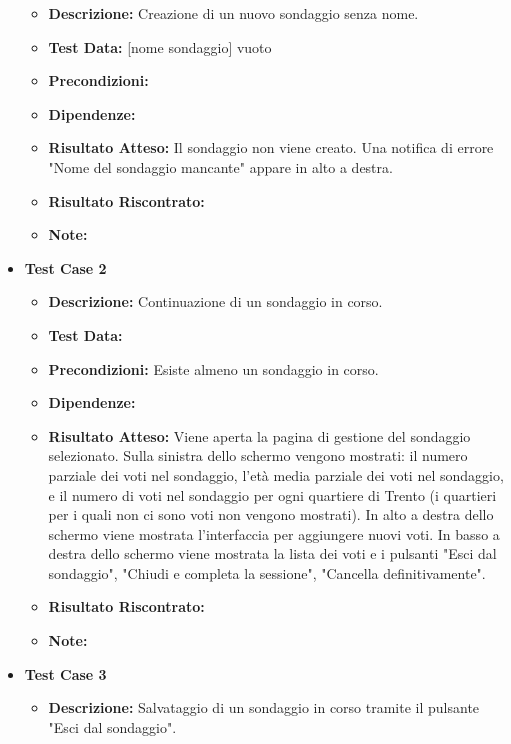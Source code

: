 \begin{itemize}
                \begin{itemize}
                    \item \textbf{Descrizione:} Creazione di un nuovo sondaggio senza nome.
                    \item \textbf{Test Data:} [nome sondaggio] vuoto
                    \item \textbf{Precondizioni:} 
                    \item \textbf{Dipendenze:}
                    \item \textbf{Risultato Atteso:} Il sondaggio non viene creato. Una notifica di errore "Nome del sondaggio mancante" appare in alto a destra.
                    \item \textbf{Risultato Riscontrato:}
                    \item \textbf{Note:}
                \end{itemize}
            \item \textbf{Test Case 2}
                \begin{itemize}
                    \item \textbf{Descrizione:} Continuazione di un sondaggio in corso.
                    \item \textbf{Test Data:}
                    \item \textbf{Precondizioni:} Esiste almeno un sondaggio in corso.
                    \item \textbf{Dipendenze:}
                    \item \textbf{Risultato Atteso:} Viene aperta la pagina di gestione del sondaggio selezionato. Sulla sinistra dello schermo vengono mostrati: il numero parziale dei voti nel sondaggio, l'età media parziale dei voti nel sondaggio, e il numero di voti nel sondaggio per ogni quartiere di Trento (i quartieri per i quali non ci sono voti non vengono mostrati). In alto a destra dello schermo viene mostrata l'interfaccia per aggiungere nuovi voti. In basso a destra dello schermo viene mostrata la lista dei voti e i pulsanti "Esci dal sondaggio", "Chiudi e completa la sessione", "Cancella definitivamente".
                    \item \textbf{Risultato Riscontrato:}
                    \item \textbf{Note:}
                \end{itemize}
            \item \textbf{Test Case 3}
                \begin{itemize}
                    \item \textbf{Descrizione:} Salvataggio di un sondaggio in corso tramite il pulsante "Esci dal sondaggio".

\end{itemize}
\end{itemize}
